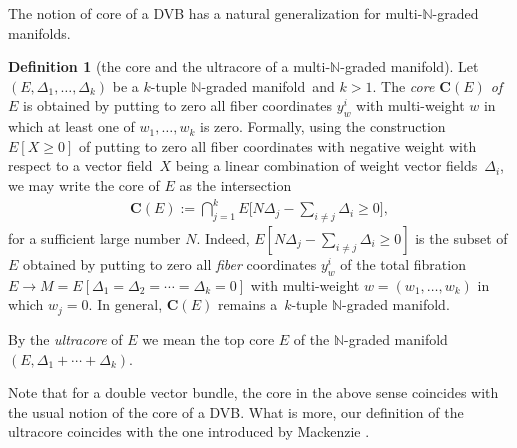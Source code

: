 \documentclass[10pt,a4paper]{amsart}
\newcommand{\grB}{{$\N$-graded manifold}}
\newcommand{\grBs}{{$\N$-graded manifolds}}
\newcommand{\N}{\mathbb{N}}
\newcommand{\ra}{\rightarrow}
\newcommand{\core}[1]{\widehat{#1}} %
\newcommand{\Core}{\mathbf{C}}
\numberwithin{equation}{section}
\theoremstyle{definition}
\newtheorem{df}[thm]{Definition}
\begin{document}
The notion of core of a DVB has a natural generalization for multi-\grBs.
\begin{df}[the core and the ultracore of a multi-\grB]\label{df:Core} Let $(E, \Delta_1, \ldots, \Delta_k)$ be a $k$-tuple \grB\ and $k>1$. The \emph{core $\Core(E)$ of $E$} is obtained by putting to zero all fiber coordinates $y^i_w$ with multi-weight $w$ in which at least one of $w_1, \ldots, w_k$ is zero.
Formally, using the construction $E[X\geq 0]$ \cite[Definition~1.8]{BGR} of putting to zero all fiber coordinates with negative weight with respect to a vector field~$X$ being a linear combination of weight vector fields~$\Delta_i$, we may write the core of $E$ as the intersection
\begin{gather*}
\Core(E):= \bigcap_{j=1}^k E\bigg[N \Delta_j - \sum_{i\neq j} \Delta_i \geq 0\bigg],
\end{gather*}
for a sufficient large number $N$. Indeed, $E[N \Delta_j - \sum_{i\neq j} \Delta_i \geq 0]$ is the subset of $E$ obtained by putting to zero all \emph{fiber} coordinates $y^i_w$ of the total fibration $E\ra M= E[\Delta_1=\Delta_2=\cdots=\Delta_k=0]$ with multi-weight $w=(w_1, \ldots, w_k)$ in which $w_j=0$. In general, $\Core(E)$ remains a~$k$-tuple \grB.

By the \emph{ultracore} of $E$ we mean the top core $\core{E}$ of the \grB\ $(E, \Delta_1+\cdots+\Delta_k)$.
\end{df}

Note that for a double vector bundle, the core in the above sense coincides with the usual notion of the core of a DVB. What is more, our definition of the ultracore coincides with the one introduced by Mackenzie
\cite{Mackenzie_Triple_VB_2005}.
\end{document}
